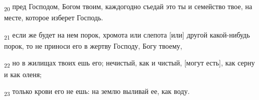 \begin{tcolorbox}
\textsubscript{20} пред Господом, Богом твоим, каждогодно съедай это ты и семейство твое, на месте, которое изберет Господь.
\end{tcolorbox}
\begin{tcolorbox}
\textsubscript{21} если же будет на нем порок, хромота или слепота [или] другой какой-нибудь порок, то не приноси его в жертву Господу, Богу твоему,
\end{tcolorbox}
\begin{tcolorbox}
\textsubscript{22} но в жилищах твоих ешь его; нечистый, как и чистый, [могут есть], как серну и как оленя;
\end{tcolorbox}
\begin{tcolorbox}
\textsubscript{23} только крови его не ешь: на землю выливай ее, как воду.
\end{tcolorbox}

